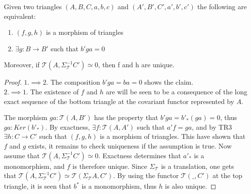     \begin{lemma}
        Given two triangles $(A,B,C,a,b,c)$ and $(A',B',C',a',b',c')$ the following are equivalent:
        \begin{center}
            \begin{minipage}[c]{0.7\textwidth}
            \end{minipage}
            \begin{minipage}[c]{0.3\textwidth}
                \begin{enumerate}
                    \item $(f,g,h)$ is a morphism of triangles
                    \item $\exists g:B\rightarrow B'$ such that $b'ga = 0$
                \end{enumerate}
            \end{minipage}
        \end{center}
        Moreover, if $\mathcal{T}(A,\Sigma_{\mathcal{T}}^{-1}C')\simeq 0$, then f and h are unique.
    \end{lemma}

    \begin{proof}
        $1. \implies 2.$ The composition $b'ga = ba = 0$ shows the claim. \\
        
        $2. \implies 1.$ The existence of $f$ and $h$ are will be seen to be a consequence of the long exact sequence of the bottom triangle at the covariant functor represented by $A$. 
        \begin{center}
        \end{center}
        The morphism $ga:\mathcal{T}(A,B')$ has the property that $b'ga=b'_*(ga)=0$, thus $ga:Ker(b'_*)$. By exactness, $\exists f:\mathcal{T}(A,A')$ such that $a'f = ga$, and by TR3 $\exists h: C \rightarrow C'$ such that $(f,g,h)$ is a morphism of triangles. This have shown that $f$ and $g$ exists, it remains to check uniqueness if the assumption is true.
        Now assume that $\mathcal{T}(A,\Sigma_{\mathcal{T}}^{-1}C')\simeq 0$. Exactness determines that $a'_*$ is a monomorphism, and $f$ is therefore unique. Since $\Sigma_{\mathcal{T}}$ is a translation, one gets that $\mathcal{T}(A,\Sigma_{\mathcal{T}}^{-1}C')\simeq\mathcal{T}(\Sigma_{\mathcal{T}}A,C')$. By using the functor $\mathcal{T}(\_,C')$ at the top triangle, it is seen that $b^*$ is a monomorphism, thus $h$ is also unique.
    \end{proof}

